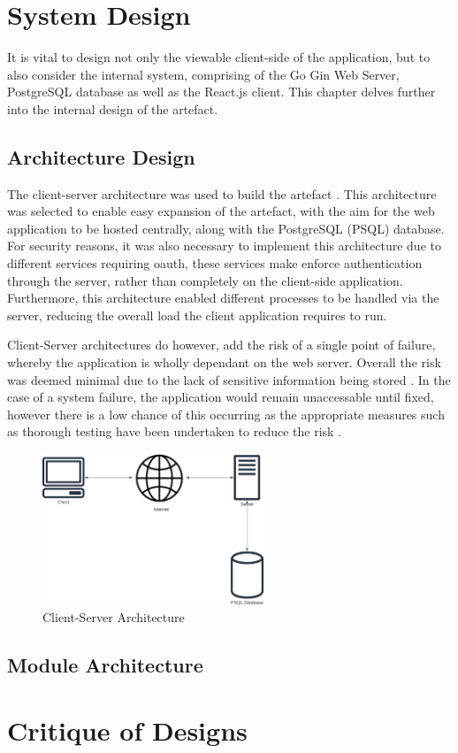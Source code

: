 \section{System Design}
\label{design:system}

It is vital to design not only the viewable client-side of the application, but to also consider the internal system, comprising of the Go Gin Web Server, PostgreSQL database as well as the React.js client. This chapter delves further into the internal design of the artefact. 

\subsection{Architecture Design}
\label{system:architecture-design}

The client-server architecture was used to build the artefact . This architecture was selected to enable easy expansion of the artefact, with the aim for the web application to be hosted centrally, along with the PostgreSQL (PSQL) database. For security reasons, it was also necessary to implement this architecture due to different services requiring oauth, these services make enforce authentication through the server, rather than completely on the client-side application. Furthermore, this architecture enabled different processes to be handled via the server, reducing the overall load the client application requires to run.

Client-Server architectures do however, add the risk of a single point of failure, whereby the application is wholly dependant on the web server. Overall the risk was deemed minimal due to the lack of sensitive information being stored . In the case of a system failure, the application would remain unaccessable until fixed, however there is a low chance of this occurring as the appropriate measures such as thorough testing have been undertaken to reduce the risk .

\clearpage
\begin{figure}[!ht]
  \centering
  \includegraphics[width=250px]{figures/client-server.png}
  \caption{Client-Server Architecture}
  \label{fig:clientserver}
\end{figure}

\subsection{Module Architecture}
\label{system:module-architecture}

\section{Critique of Designs}
\label{design:critique}